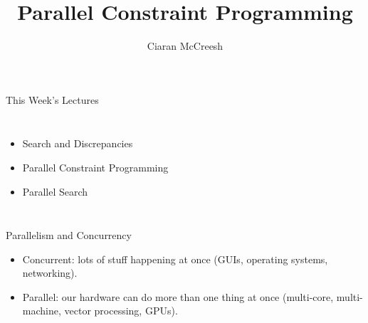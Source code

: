 \documentclass{beamer}
\title{Parallel Constraint Programming}
\author[Ciaran McCreesh]{\textcolor{uofgblue}{Ciaran McCreesh}}
\begin{document}
{
    \begin{frame}
        \titlepage
    \end{frame}
}

\begin{frame}{This Week's Lectures}
    \begin{columns}
        \begin{itemize}
            \item Search and Discrepancies
            \item \textcolor{uofgblue}{Parallel Constraint Programming}
            \item Parallel Search
        \end{itemize}
    \end{columns}
\end{frame}

\begin{frame}{Parallelism and Concurrency}
    \begin{itemize}
        \item Concurrent: lots of stuff happening at once (GUIs, operating systems, networking).

        \item Parallel: our hardware can do more than one thing at once (multi-core, multi-machine,
            vector processing, GPUs).
    \end{itemize}
\end{frame}
\end{document}
